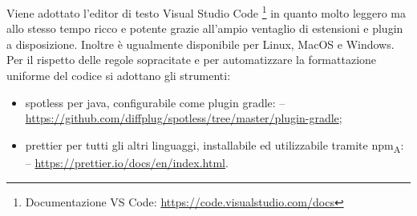             Viene adottato l'editor di testo Visual Studio Code \footnote{Documentazione VS Code: \url{https://code.visualstudio.com/docs}} in quanto molto leggero ma allo stesso tempo ricco e potente grazie all'ampio ventaglio di estensioni e plugin a disposizione. Inoltre è ugualmente disponibile per Linux, MacOS e Windows.\\
            Per il rispetto delle regole sopracitate e per automatizzare la formattazione uniforme del codice si adottano gli strumenti:
            \begin{itemize}
                \item spotless per java, configurabile come plugin gradle:
                    \subitem -- \url{https://github.com/diffplug/spotless/tree/master/plugin-gradle};
                \item prettier per tutti gli altri linguaggi, installabile ed utilizzabile tramite npm\textsubscript{A}:
                    \subitem -- \url{https://prettier.io/docs/en/index.html}.
            \end{itemize}

















